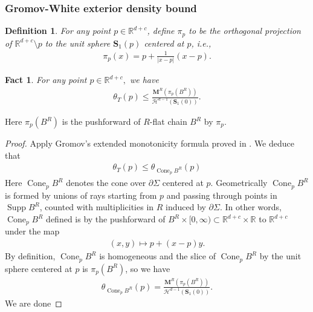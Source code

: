 \documentclass[11pt,a4paper]{amsart}
\numberwithin{equation}{section}
\newcommand{\supp}{\operatorname{Supp}}
\newcommand{\hm}{\mathcal{H}}
\newcommand{\Si}{\Sigma}
\newcommand{\ms}{\mathbf{M}}
\newcommand{\s}{\subset}
\newcommand{\pd}{\partial}
\newcommand{\R}{\mathbb{R}}
\theoremstyle{plain}
\newtheorem{fact}{Fact}[subsection]
\newtheorem{defn}{Definition}[subsection]
\theoremstyle{definition}
\numberwithin{equation}{subsection}
\begin{document}
\subsubsection{Gromov-White exterior density bound}
\begin{defn}
	For any point $p\in\R^{d+c}$, define $\pi_p$ to be the orthogonal projection of $\R^{d+c}\setminus p$ to the unit sphere $\mathbf{S}_1(p)$ centered at $p$, i.e.,
	\begin{align*}
		\pi_p(x)=p+\frac{1}{|x-p|}(x-p).
	\end{align*} 
\end{defn}
\begin{fact}\label{fctdsttb}
	For any point $p\in \R^{d+c},$ we have
	\begin{align*}
		\theta_T(p)\le \frac{\ms^R\left(\pi_p\left( B^R\right)\right)}{\hm^{d-1}(\mathbf{S}_1(0))}.
	\end{align*}
\end{fact}
Here $\pi_p\left( B^R\right)$ is the pushforward of $R$-flat chain $ B^R$ by $\pi_p$.
\begin{proof}
	Apply Gromov's \cite[Section 8.1-8.2]{MGfrm} extended monotonicity formula proved in \cite[Section 9.2, 9.3]{EWW}. We deduce that \cite[Theorem 1.3]{EWW}
	\begin{align*}
		\theta_T(p)\le \theta_{\operatorname{Cone}_p B^R}(p)
	\end{align*}Here $\operatorname{Cone}_p B^R$ denotes the cone over $\pd \Si$ centered at $p.$ Geometrically $\operatorname{Cone}_p B^R$ is formed by unions of rays starting from $p$ and passing through points in $\supp B^R$, counted with multiplicities in $R$ induced by $\pd \Si$. In other words, $\operatorname{Cone}_p B^R$ defined is by the pushforward of $ B^R\times[0,\infty)\s \R^{d+c}\times \R$ to $\R^{d+c}$ under the map
	\begin{align*}
		(x,y)\mapsto p+(x-p)y.
	\end{align*}
	By definition, $\operatorname{Cone}_p B^R$ is homogeneous and the slice of $\operatorname{Cone}_p B^R$ by the unit sphere centered at $p$ is $\pi_p\left( B^R\right)$, so we have
	\begin{align*}
		\theta_{\operatorname{Cone}_p B^R}(p)=\frac{\ms^R\left(\pi_p\left( B^R\right)\right)}{\hm^{d-1}(\mathbf{S}_1(0))}.
	\end{align*}
	We are done
\end{proof}
\end{document}

